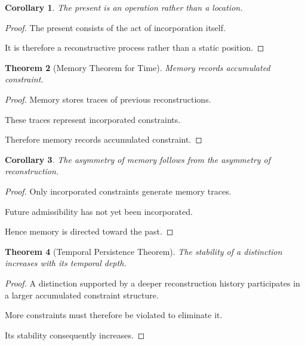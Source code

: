 \documentclass[12pt,oneside]{article}
\newtheorem{theorem}{Theorem}[section] \newtheorem{lemma}[theorem]{Lemma} \newtheorem{proposition}[theorem]{Proposition} \newtheorem{corollary}[theorem]{Corollary}
\theoremstyle{definition}
\begin{document}
\begin{corollary}

The present is an operation rather than a location.

\end{corollary}

\begin{proof}

The present consists of the act of incorporation itself.

It is therefore a reconstructive process rather than a static position.

\end{proof}

\begin{theorem}[Memory Theorem for Time]

Memory records accumulated constraint.

\end{theorem}

\begin{proof}

Memory stores traces of previous reconstructions.

These traces represent incorporated constraints.

Therefore memory records accumulated constraint.

\end{proof}

\begin{corollary}

The asymmetry of memory follows from the asymmetry of reconstruction.

\end{corollary}

\begin{proof}

Only incorporated constraints generate memory traces.

Future admissibility has not yet been incorporated.

Hence memory is directed toward the past.

\end{proof}

\begin{theorem}[Temporal Persistence Theorem]

The stability of a distinction increases with its temporal depth.

\end{theorem}

\begin{proof}

A distinction supported by a deeper reconstruction history participates in a larger accumulated constraint structure.

More constraints must therefore be violated to eliminate it.

Its stability consequently increases.

\end{proof}
\end{document}

